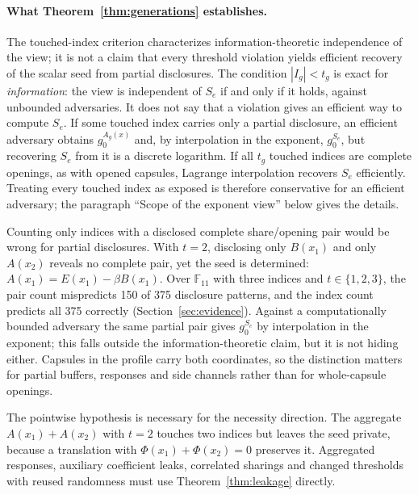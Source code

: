 \documentclass[pdflatex,sn-mathphys-num]{sn-jnl}%
\theoremstyle{plain}
\theoremstyle{definition}
\newcommand{\F}{\mathbb{F}}
\begin{document}
\paragraph{What Theorem~\ref{thm:generations} establishes.}
The touched-index criterion characterizes information-theoretic independence of the view; it is not a claim that every threshold violation yields efficient recovery of the scalar seed from partial disclosures. The condition $|I_g|<t_g$ is exact for \emph{information}: the view is independent of $S_e$ if and only if it holds, against unbounded adversaries. It does not say that a violation gives an efficient way to compute $S_e$. If some touched index carries only a partial disclosure, an efficient adversary obtains $g_0^{A_g(x)}$ and, by interpolation in the exponent, $g_0^{S_e}$, but recovering $S_e$ from it is a discrete logarithm. If all $t_g$ touched indices are complete openings, as with opened capsules, Lagrange interpolation recovers $S_e$ efficiently. Treating every touched index as exposed is therefore conservative for an efficient adversary; the paragraph ``Scope of the exponent view'' below gives the details.

Counting only indices with a disclosed complete share/opening pair would be wrong for partial disclosures. With $t=2$, disclosing only $B(x_1)$ and only $A(x_2)$ reveals no complete pair, yet the seed is determined: $A(x_1)=E(x_1)-\beta B(x_1)$. Over $\F_{11}$ with three indices and $t\in\{1,2,3\}$, the pair count mispredicts 150 of 375 disclosure patterns, and the index count predicts all 375 correctly (Section~\ref{sec:evidence}). Against a computationally bounded adversary the same partial pair gives $g_0^{S_e}$ by interpolation in the exponent; this falls outside the information-theoretic claim, but it is not hiding either. Capsules in the profile carry both coordinates, so the distinction matters for partial buffers, responses and side channels rather than for whole-capsule openings.

The pointwise hypothesis is necessary for the necessity direction. The aggregate $A(x_1)+A(x_2)$ with $t=2$ touches two indices but leaves the seed private, because a translation with $\Phi(x_1)+\Phi(x_2)=0$ preserves it. Aggregated responses, auxiliary coefficient leaks, correlated sharings and changed thresholds with reused randomness must use Theorem~\ref{thm:leakage} directly.
\end{document}
